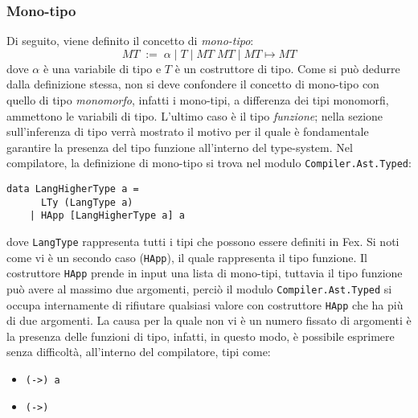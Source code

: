 \documentclass[10pt,a4paper]{article}
\begin{document}
\hypertarget{Mono-tipo}{\subsubsection{Mono-tipo}}
Di seguito, viene definito il concetto di \textit{mono-tipo}:
\[ MT \; := \; \alpha \; | \; T \; | \; MT \; MT \; | \; MT \mapsto MT \]
dove $ \alpha $ è una variabile di tipo e $ T $ è un costruttore di tipo. Come si può dedurre dalla definizione stessa,
non si deve confondere
il concetto di mono-tipo con quello di tipo \textit{monomorfo}, infatti i mono-tipi, a differenza dei tipi monomorfi,
ammettono le variabili di tipo. L'ultimo caso è il tipo \textit{funzione}; nella sezione sull'inferenza di tipo verrà
mostrato il motivo per il quale è fondamentale garantire la presenza del tipo funzione all'interno del type-system.
Nel compilatore, la definizione di mono-tipo si trova nel modulo \texttt{Compiler.Ast.Typed}:
\begin{lstlisting}
data LangHigherType a =
      LTy (LangType a)
    | HApp [LangHigherType a] a
\end{lstlisting}
dove \texttt{LangType} rappresenta tutti i tipi che possono essere definiti in Fex. Si noti come vi è un secondo
caso (\texttt{HApp}), il quale rappresenta il tipo funzione. Il costruttore \texttt{HApp} prende in input una lista
di mono-tipi, tuttavia il tipo funzione può avere al massimo due argomenti, perciò il modulo \texttt{Compiler.Ast.Typed}
si occupa internamente di rifiutare qualsiasi valore con costruttore \texttt{HApp} che ha più di due argomenti.
La causa per la quale non vi è un numero fissato di argomenti è la presenza delle funzioni di tipo, infatti,
in questo modo, è possibile esprimere senza difficoltà, all'interno del compilatore, tipi come:
\begin{itemize}
\item \texttt{(->) a}
\item \texttt{(->)}
\end{itemize}
\end{document}
